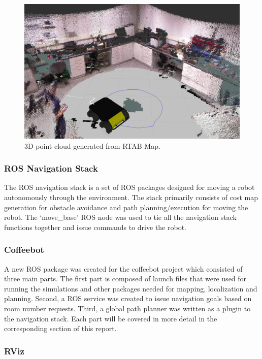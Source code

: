 \documentclass[letterpaper, 10 pt, conference]{ieeeconf}  %
\begin{document}
	\begin{figure}[!ht]
		\centering
		\includegraphics[width=1.0\columnwidth]{Figures/3D_Map}
		\caption{3D point cloud generated from RTAB-Map.}
		\label{rtabmap_point_cloud}
	\end{figure}

\subsubsection{ROS Navigation Stack}

The ROS navigation stack is a set of ROS packages designed for moving a robot autonomously through the environment. The stack primarily consists of cost map generation for obstacle avoidance and path planning/execution for moving the robot. The \enquote*{move\_base} ROS node was used to tie all the navigation stack functions together and issue commands to drive the robot.

\subsubsection{Coffeebot}

A new ROS package was created for the coffeebot project which consisted of three main parts. The first part is composed of launch files that were used for running the simulations and other packages needed for mapping, localization and planning. Second, a ROS service was created to issue navigation goals based on room number requests. Third, a global path planner was written as a plugin to the navigation stack. Each part will be covered in more detail in the corresponding section of this report.

\subsubsection{RViz}
\end{document}

